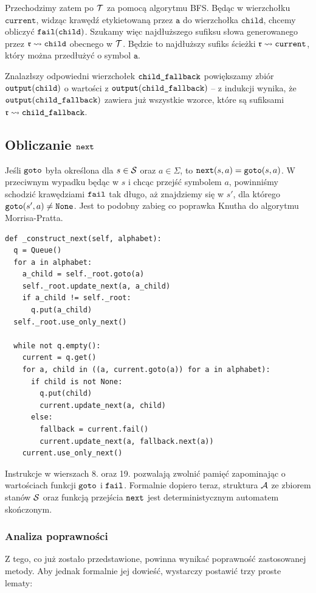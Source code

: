 Przechodzimy zatem po $\operatorname{\mathcal{T}}$ za pomocą algorytmu BFS. Będąc w wierzchołku $\texttt{current}$, widząc krawędź etykietowaną przez $\texttt{a}$ do wierzchołka $\texttt{child}$, chcemy obliczyć $\operatorname{\texttt{fail}}(\texttt{child})$. Szukamy więc najdłuższego sufiksu słowa generowanego przez $\operatorname{\mathfrak{r}}\rightsquigarrow\texttt{child}$ obecnego w $\operatorname{\mathcal{T}}$. Będzie to najdłuższy sufiks ścieżki $\operatorname{\mathfrak{r}}\rightsquigarrow\texttt{current}$, który można przedłużyć o symbol $\texttt{a}$.

Znalazłszy odpowiedni wierzchołek $\texttt{child\textunderscore fallback}$ powiększamy zbiór $\operatorname{\texttt{output}}(\texttt{child})$ o wartości z  $\operatorname{\texttt{output}}(\texttt{child\textunderscore fallback})$ -- z indukcji wynika, że $\operatorname{\texttt{output}}(\texttt{child\textunderscore fallback})$ zawiera już wszystkie wzorce, które są sufiksami $\operatorname{\mathfrak{r}}\rightsquigarrow\texttt{child\textunderscore fallback}$.

\subsection{Obliczanie $\operatorname{\texttt{next}}$}

Jeśli $\operatorname{\texttt{goto}}$ była określona dla $s\in\operatorname{\mathcal{S}}$ oraz $a\in\Sigma$, to $\operatorname{\texttt{next}}(s, a) = \operatorname{\texttt{goto}}(s, a)$. W przeciwnym wypadku będąc w $s$ i chcąc przejść symbolem $a$, powinniśmy schodzić krawędziami $\operatorname{\texttt{fail}}$ tak długo, aż znajdziemy się w $s'$, dla którego $\operatorname{\texttt{goto}}(s', a)\neq\operatorname{\texttt{None}}$. Jest to podobny zabieg co poprawka Knutha do algorytmu Morrisa-Pratta.
\begin{verbatim}
def _construct_next(self, alphabet):
  q = Queue()
  for a in alphabet:
    a_child = self._root.goto(a)
    self._root.update_next(a, a_child)
    if a_child != self._root:
      q.put(a_child)
  self._root.use_only_next()

  while not q.empty():
    current = q.get()
    for a, child in ((a, current.goto(a)) for a in alphabet):
      if child is not None:
        q.put(child)
        current.update_next(a, child)
      else:
        fallback = current.fail()
        current.update_next(a, fallback.next(a))
    current.use_only_next()
\end{verbatim}

Instrukcje w wierszach 8. oraz 19. pozwalają zwolnić pamięć zapominając o wartościach funkcji $\operatorname{\texttt{goto}}$ i $\operatorname{\texttt{fail}}$. Formalnie dopiero teraz, struktura $\operatorname{\mathcal{A}}$ ze zbiorem stanów $\operatorname{\mathcal{S}}$ oraz funkcją przejścia $\operatorname{\texttt{next}}$ jest deterministycznym automatem skończonym.

\subsubsection{Analiza poprawności}
Z tego, co już zostało przedstawione, powinna wynikać poprawność zastosowanej metody. Aby jednak formalnie jej dowieść, wystarczy postawić trzy proste lematy:

